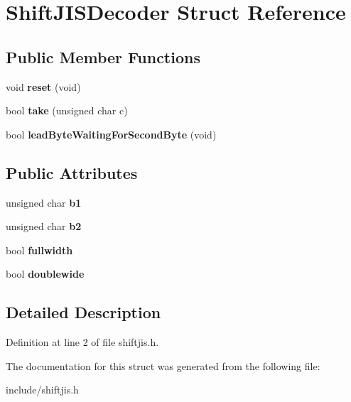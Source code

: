 \hypertarget{structShiftJISDecoder}{\section{Shift\-J\-I\-S\-Decoder Struct Reference}
\label{structShiftJISDecoder}
}
\subsection*{Public Member Functions}
\begin{DoxyCompactItemize}
\item 
\hypertarget{structShiftJISDecoder_a5644a78a4d924ebb88e6c3cc03c81bfa}{void {\bfseries reset} (void)}\label{structShiftJISDecoder_a5644a78a4d924ebb88e6c3cc03c81bfa}

\item 
\hypertarget{structShiftJISDecoder_a7bcbb2220af2a5e822e67eac60dcac7c}{bool {\bfseries take} (unsigned char c)}\label{structShiftJISDecoder_a7bcbb2220af2a5e822e67eac60dcac7c}

\item 
\hypertarget{structShiftJISDecoder_af34a5dbc6ef7afa9a2eb481edc6eff42}{bool {\bfseries lead\-Byte\-Waiting\-For\-Second\-Byte} (void)}\label{structShiftJISDecoder_af34a5dbc6ef7afa9a2eb481edc6eff42}

\end{DoxyCompactItemize}
\subsection*{Public Attributes}
\begin{DoxyCompactItemize}
\item 
\hypertarget{structShiftJISDecoder_aaea1264d43f49a9466f638e097dce19d}{unsigned char {\bfseries b1}}\label{structShiftJISDecoder_aaea1264d43f49a9466f638e097dce19d}

\item 
\hypertarget{structShiftJISDecoder_abf6d4dece1d6b87d206f27d15a3217d0}{unsigned char {\bfseries b2}}\label{structShiftJISDecoder_abf6d4dece1d6b87d206f27d15a3217d0}

\item 
\hypertarget{structShiftJISDecoder_ad913a308dbb1f9c79602f479daa6185b}{bool {\bfseries fullwidth}}\label{structShiftJISDecoder_ad913a308dbb1f9c79602f479daa6185b}

\item 
\hypertarget{structShiftJISDecoder_ae12636daf9c132f8b8efc974a66a95d8}{bool {\bfseries doublewide}}\label{structShiftJISDecoder_ae12636daf9c132f8b8efc974a66a95d8}

\end{DoxyCompactItemize}


\subsection{Detailed Description}


Definition at line 2 of file shiftjis.\-h.



The documentation for this struct was generated from the following file\-:\begin{DoxyCompactItemize}
\item 
include/shiftjis.\-h\end{DoxyCompactItemize}
